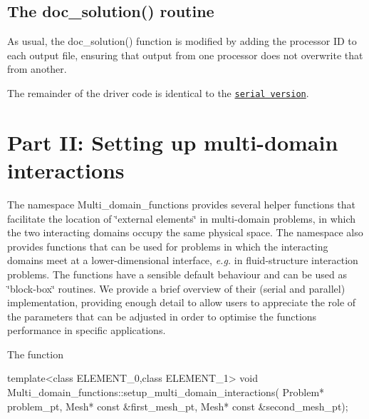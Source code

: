 \hypertarget{index_doc_solution}{}\subsection{The doc\+\_\+solution() routine}\label{index_doc_solution}
As usual, the {\ttfamily doc\+\_\+solution()} function is modified by adding the processor ID to each output file, ensuring that output from one processor does not overwrite that from another.





The remainder of the driver code is identical to the \href{../../../multi_physics/multi_domain_ref_b_convect/html/index.html}{\tt serial version}.



 

\hypertarget{index_multi_domain}{}\section{Part I\+I\+: Setting up multi-\/domain interactions}\label{index_multi_domain}
The namespace {\ttfamily Multi\+\_\+domain\+\_\+functions} provides several helper functions that facilitate the location of \char`\"{}external elements\char`\"{} in multi-\/domain problems, in which the two interacting domains occupy the same physical space. The namespace also provides functions that can be used for problems in which the interacting domains meet at a lower-\/dimensional interface, {\itshape  e.\+g.} in fluid-\/structure interaction problems. The functions have a sensible default behaviour and can be used as \char`\"{}block-\/box\char`\"{} routines. We provide a brief overview of their (serial and parallel) implementation, providing enough detail to allow users to appreciate the role of the parameters that can be adjusted in order to optimise the functions\textquotesingle{} performance in specific applications.

The function


\begin{DoxyCode}
\textcolor{keyword}{template}<\textcolor{keyword}{class} ELEMENT\_0,\textcolor{keyword}{class} ELEMENT\_1>     
\textcolor{keywordtype}{void} Multi\_domain\_functions::setup\_multi\_domain\_interactions(
                                       Problem* problem\_pt, 
                                       Mesh* \textcolor{keyword}{const} &first\_mesh\_pt,
                                       Mesh* \textcolor{keyword}{const} &second\_mesh\_pt);
\end{DoxyCode}


